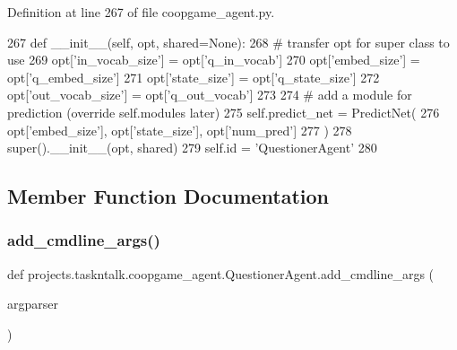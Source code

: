 Definition at line 267 of file coopgame\+\_\+agent.\+py.


\begin{DoxyCode}
267     \textcolor{keyword}{def }\_\_init\_\_(self, opt, shared=None):
268         \textcolor{comment}{# transfer opt for super class to use}
269         opt[\textcolor{stringliteral}{'in\_vocab\_size'}] = opt[\textcolor{stringliteral}{'q\_in\_vocab'}]
270         opt[\textcolor{stringliteral}{'embed\_size'}] = opt[\textcolor{stringliteral}{'q\_embed\_size'}]
271         opt[\textcolor{stringliteral}{'state\_size'}] = opt[\textcolor{stringliteral}{'q\_state\_size'}]
272         opt[\textcolor{stringliteral}{'out\_vocab\_size'}] = opt[\textcolor{stringliteral}{'q\_out\_vocab'}]
273 
274         \textcolor{comment}{# add a module for prediction (override self.modules later)}
275         self.predict\_net = PredictNet(
276             opt[\textcolor{stringliteral}{'embed\_size'}], opt[\textcolor{stringliteral}{'state\_size'}], opt[\textcolor{stringliteral}{'num\_pred'}]
277         )
278         super().\_\_init\_\_(opt, shared)
279         self.id = \textcolor{stringliteral}{'QuestionerAgent'}
280 
\end{DoxyCode}


\subsection{Member Function Documentation}
\mbox{\label{classprojects_1_1taskntalk_1_1coopgame__agent_1_1QuestionerAgent_a88eea735917e813d29dd8543565b5d63}} 
\subsubsection{\texorpdfstring{add\+\_\+cmdline\+\_\+args()}{add\_cmdline\_args()}}
{\footnotesize\ttfamily def projects.\+taskntalk.\+coopgame\+\_\+agent.\+Questioner\+Agent.\+add\+\_\+cmdline\+\_\+args (\begin{DoxyParamCaption}\item[{}]{argparser }\end{DoxyParamCaption})\hspace{0.3cm}{\ttfamily [static]}}

